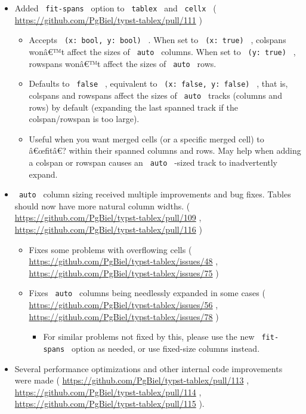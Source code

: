 \begin{itemize}
\tightlist
\item
  Added \texttt{\ fit-spans\ } option to \texttt{\ tablex\ } and
  \texttt{\ cellx\ } (
  \url{https://github.com/PgBiel/typst-tablex/pull/111} )

  \begin{itemize}
  \tightlist
  \item
    Accepts \texttt{\ (x:\ bool,\ y:\ bool)\ } . When set to
    \texttt{\ (x:\ true)\ } , colspans wonâ€™t affect the sizes of
    \texttt{\ auto\ } columns. When set to \texttt{\ (y:\ true)\ } ,
    rowspans wonâ€™t affect the sizes of \texttt{\ auto\ } rows.
  \item
    Defaults to \texttt{\ false\ } , equivalent to
    \texttt{\ (x:\ false,\ y:\ false)\ } , that is, colspans and
    rowspans affect the sizes of \texttt{\ auto\ } tracks (columns and
    rows) by default (expanding the last spanned track if the
    colspan/rowspan is too large).
  \item
    Useful when you want merged cells (or a specific merged cell) to
    â€œfitâ€? within their spanned columns and rows. May help when
    adding a colspan or rowspan causes an \texttt{\ auto\ } -sized track
    to inadvertently expand.
  \end{itemize}
\item
  \texttt{\ auto\ } column sizing received multiple improvements and bug
  fixes. Tables should now have more natural column widths. (
  \url{https://github.com/PgBiel/typst-tablex/pull/109} ,
  \url{https://github.com/PgBiel/typst-tablex/pull/116} )

  \begin{itemize}
  \tightlist
  \item
    Fixes some problems with overflowing cells (
    \url{https://github.com/PgBiel/typst-tablex/issues/48} ,
    \url{https://github.com/PgBiel/typst-tablex/issues/75} )
  \item
    Fixes \texttt{\ auto\ } columns being needlessly expanded in some
    cases ( \url{https://github.com/PgBiel/typst-tablex/issues/56} ,
    \url{https://github.com/PgBiel/typst-tablex/issues/78} )

    \begin{itemize}
    \tightlist
    \item
      For similar problems not fixed by this, please use the new
      \texttt{\ fit-spans\ } option as needed, or use fixed-size columns
      instead.
    \end{itemize}
  \end{itemize}
\item
  Several performance optimizations and other internal code improvements
  were made ( \url{https://github.com/PgBiel/typst-tablex/pull/113} ,
  \url{https://github.com/PgBiel/typst-tablex/pull/114} ,
  \url{https://github.com/PgBiel/typst-tablex/pull/115} ).


\end{itemize}
